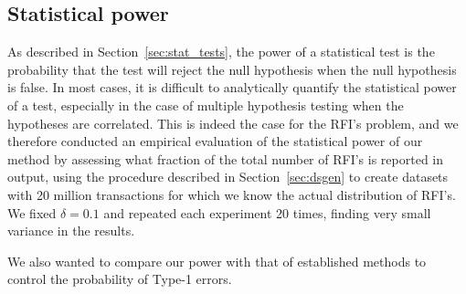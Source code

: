 \subsection{Statistical power}\label{sec:statpow}
As described in Section~\ref{sec:stat_tests}, the power of a statistical test is the probability that the test will
reject the null hypothesis when the null hypothesis is false. 
In most cases, it is difficult to analytically quantify the
statistical power of a test, especially in the case of multiple hypothesis
testing when the hypotheses are correlated. This is indeed the case for the
RFI's problem, and we therefore conducted an empirical evaluation of the statistical
power of our method by assessing what fraction of the total number of
RFI's is reported in output, using the procedure described in
Section~\ref{sec:dsgen} to create datasets with 20 million transactions for which
we know the actual distribution of RFI's. We fixed $\delta=0.1$ and repeated
each experiment 20 times, finding very small variance in the results.

We also wanted to compare our power with that of established methods
to control the probability of Type-1 errors.

